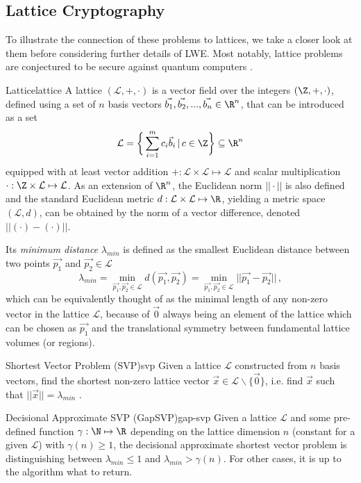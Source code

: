 \subsection{Lattice Cryptography}
To illustrate the connection of these problems to lattices, we take a closer look at them before considering further details of LWE.
Most notably, lattice problems are conjectured to be secure against quantum computers \parencite{2018-lattice-problems}.

\newcommand{\lat}{\mathcal{L}}
\begin{definition}{Lattice}{lattice}
  A lattice $(\lat, +, \cdot)$ is a vector field over the integers $(\Z, +, \cdot)$, defined using a set of $n$ basis vectors $\vec{b_1}, \vec{b_2}, ..., \vec{b_n} \in \R^n$, that can be introduced as a set
  $$\lat = \bigg\{\sum_{i=1}^m c_i \vec{b}_i \,|\, c \in \Z\bigg\} \subseteq \R^n$$
  equipped with at least vector addition $+: \lat \times \lat \mapsto \lat$ and scalar multiplication $\cdot: \Z \times \lat \mapsto \lat$.
  As an extension of $\R^n$, the Euclidean norm $||\cdot||$ is also defined and the standard Euclidean metric $d: \lat \times \lat \mapsto \R$, yielding a metric space $(\lat, d)$, can be obtained by the norm of a vector difference, denoted $||(\cdot) - (\cdot)||$.
\end{definition}

Its \textit{minimum distance} $\lambda_{min}$ is defined as the smallest Euclidean distance between two points $\vec{p_1}$ and $\vec{p_2} \in \lat$
$$\lambda_{min} = \min_{\vec{p_1}, \vec{p_2} \in \lat} d(\vec{p_1}, \vec{p_2}) =
  \min_{\vec{p_1}, \vec{p_2} \in \lat} ||\vec{p_1} - \vec{p_2}|| \,,$$
which can be equivalently thought of as the minimal length of any non-zero vector in the lattice $\lat$, because of $\vec{0}$ always being an element of the lattice which can be chosen as $\vec{p_1}$ and the translational symmetry between fundamental lattice volumes (or regions).

\begin{definition}{Shortest Vector Problem (SVP)}{svp}
  Given a lattice $\lat$ constructed from $n$ basis vectors, find the shortest non-zero lattice vector $\vec{x} \in \lat \backslash \{\vec{0}\}$, i.e. find $\vec{x}$ such that $||\vec{x}|| = \lambda_{min}$ \parencite{2016-decade-of-lattice}.
\end{definition}

\begin{definition}{Decisional Approximate SVP (GapSVP)}{gap-svp}
  Given a lattice $\lat$ and some pre-defined function $\gamma: \N \mapsto \R$ depending on the lattice dimension $n$ (constant for a given $\lat$) with $\gamma(n) \geq 1$, the decisional approximate shortest vector problem is distinguishing between $\lambda_{min} \leq 1$ and $\lambda_{min} > \gamma(n)$.
  For other cases, it is up to the algorithm what to return.
\end{definition}

